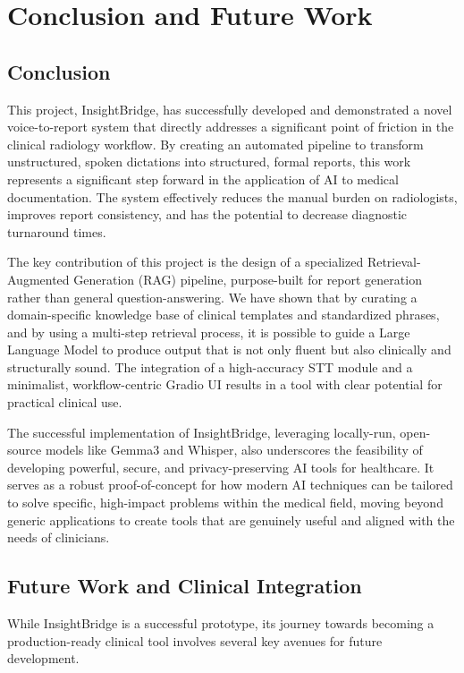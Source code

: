 \chapter{Conclusion and Future Work}
\label{cha:conclusion}

\section{Conclusion}

This project, InsightBridge, has successfully developed and demonstrated a novel voice-to-report system that directly addresses a significant point of friction in the clinical radiology workflow. By creating an automated pipeline to transform unstructured, spoken dictations into structured, formal reports, this work represents a significant step forward in the application of AI to medical documentation. The system effectively reduces the manual burden on radiologists, improves report consistency, and has the potential to decrease diagnostic turnaround times.

The key contribution of this project is the design of a specialized Retrieval-Augmented Generation (RAG) pipeline, purpose-built for report generation rather than general question-answering. We have shown that by curating a domain-specific knowledge base of clinical templates and standardized phrases, and by using a multi-step retrieval process, it is possible to guide a Large Language Model to produce output that is not only fluent but also clinically and structurally sound. The integration of a high-accuracy STT module and a minimalist, workflow-centric Gradio UI results in a tool with clear potential for practical clinical use.

The successful implementation of InsightBridge, leveraging locally-run, open-source models like Gemma3 and Whisper, also underscores the feasibility of developing powerful, secure, and privacy-preserving AI tools for healthcare. It serves as a robust proof-of-concept for how modern AI techniques can be tailored to solve specific, high-impact problems within the medical field, moving beyond generic applications to create tools that are genuinely useful and aligned with the needs of clinicians.

\section{Future Work and Clinical Integration}

While InsightBridge is a successful prototype, its journey towards becoming a production-ready clinical tool involves several key avenues for future development.

